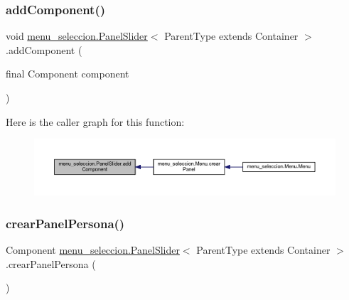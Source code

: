 \subsubsection{\texorpdfstring{add\+Component()}{addComponent()}}
{\footnotesize\ttfamily void \mbox{\hyperlink{classmenu__seleccion_1_1_panel_slider}{menu\+\_\+seleccion.\+Panel\+Slider}}$<$ Parent\+Type extends Container $>$.add\+Component (\begin{DoxyParamCaption}\item[{final Component}]{component }\end{DoxyParamCaption})}

Here is the caller graph for this function\+:
\nopagebreak
\begin{figure}[H]
\begin{center}
\leavevmode
\includegraphics[width=350pt]{classmenu__seleccion_1_1_panel_slider_a785cef2aa278e747968467512334debe_icgraph}
\end{center}
\end{figure}
\mbox{\label{classmenu__seleccion_1_1_panel_slider_ac08af6fbde0b2c7dd9faadf96b2f42b9}} 
\subsubsection{\texorpdfstring{crear\+Panel\+Persona()}{crearPanelPersona()}}
{\footnotesize\ttfamily Component \mbox{\hyperlink{classmenu__seleccion_1_1_panel_slider}{menu\+\_\+seleccion.\+Panel\+Slider}}$<$ Parent\+Type extends Container $>$.crear\+Panel\+Persona (\begin{DoxyParamCaption}{ }\end{DoxyParamCaption})}

